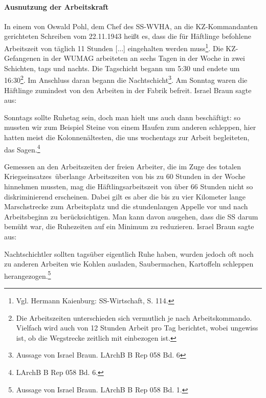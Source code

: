 \documentclass[a4paper,12pt,ngerman,
]{nisebook}
\begin{document}
\begin{landscape}
\end{landscape}

\paragraph{Ausnutzung der Arbeitskraft}
In einem von Oswald Pohl, dem Chef des SS-WVHA, an die KZ-Kommandanten gerichteten Schreiben vom 22.11.1943 heißt es, dass \glqq die für Häftlinge befohlene Arbeitszeit von täglich 11 Stunden [...] eingehalten werden muss\grqq\footnote{Vgl. Hermann Kaienburg: SS-Wirtschaft, S. 114.}. Die KZ-Gefangenen in der WUMAG arbeiteten an sechs Tagen in der Woche in zwei Schichten, tags und nachts. Die Tagschicht begann um 5:30 und endete um 16:30\footnote{Die Arbeitszeiten unterschieden sich vermutlich je nach Arbeitskommando. Vielfach wird auch von 12 Stunden Arbeit pro Tag berichtet, wobei ungewiss ist, ob die Wegstrecke zeitlich mit einbezogen ist.}. Im Anschluss daran begann die Nachtschicht\footnote{Aussage von Israel Braun. LArchB B Rep 058 Bd. 6}. Am Sonntag waren die Häftlinge zumindest von den Arbeiten in der Fabrik befreit. Israel Braun sagte aus:

\begin{leftbar}
Sonntags sollte Ruhetag sein, doch man hielt uns auch dann beschäftigt: so mussten wir zum Beispiel Steine von einem Haufen zum anderen schleppen, hier hatten meist die Kolonnenältesten, die uns wochentags zur Arbeit begleiteten, das Sagen.\footnote{LArchB B Rep 058 Bd. 6.}
\end{leftbar}

Gemessen an den Arbeitszeiten der freien Arbeiter, die im Zuge des \glqq totalen Kriegseinsatzes\grqq~überlange Arbeitszeiten von bis zu 60 Stunden in der Woche hinnehmen mussten, mag die Häftlingsarbeitszeit von über 66 Stunden nicht so diskriminierend erscheinen. Dabei gilt es aber die bis zu vier Kilometer lange Marschstrecke zum Arbeitsplatz und die stundenlangen Appelle vor und nach Arbeitsbeginn zu berücksichtigen. Man kann davon ausgehen, dass die SS darum bemüht war, die Ruhezeiten auf ein Minimum zu reduzieren. Israel Braun sagte aus:

\begin{leftbar}
Nachtschichtler sollten tagsüber eigentlich Ruhe haben, wurden jedoch oft noch zu anderen Arbeiten wie Kohlen ausladen, Saubermachen, Kartoffeln schleppen herangezogen.\footnote{Aussage von Israel Braun. LArchB B Rep 058 Bd. 1.}
\end{leftbar}
\end{document}
